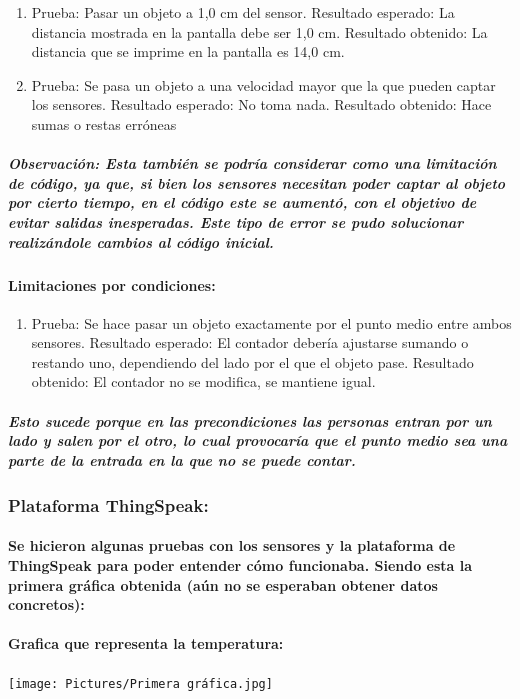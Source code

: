 \documentclass[12pt]{article} %
\newcommand{\normalsubparagraph}[1]{\subparagraph{\textnormal{#1}}}
\newcommand{\normalparagraph}[1]{\paragraph{\textnormal{#1}}}
\begin{document}
\begin{enumerate}
    \item Prueba: Pasar un objeto a 1,0 cm del sensor.  
Resultado esperado: La distancia mostrada en la pantalla debe ser 1,0 cm.
Resultado obtenido: La distancia que se imprime en la pantalla es 14,0 cm.
    \item Prueba: Se pasa un objeto a una velocidad mayor que la que pueden captar los sensores.
Resultado esperado: No toma nada.
Resultado obtenido: Hace sumas o restas erróneas
\end{enumerate}
\newpage
\subparagraph{Observación: Esta también se podría considerar como una limitación de código, ya que, si bien los sensores necesitan poder captar al objeto por cierto tiempo, en el código este se aumentó, con el objetivo de evitar salidas inesperadas. Este tipo de error se pudo solucionar realizándole cambios al código inicial.}

\normalparagraph{Limitaciones por condiciones:}
\begin{enumerate}
    \item Prueba: Se hace pasar un objeto exactamente por el punto medio entre ambos sensores.
Resultado esperado: El contador debería ajustarse sumando o restando uno, dependiendo del lado por el que el objeto pase.
Resultado obtenido: El contador no se modifica, se mantiene igual.
\end{enumerate}

\normalsubparagraph{Esto sucede porque en las precondiciones las personas entran por un lado y salen por el otro, lo cual provocaría que el punto medio sea una parte de la entrada en la que no se puede contar.}

\subsubsection{Plataforma ThingSpeak:} %
\normalparagraph{Se hicieron algunas pruebas con los sensores y la plataforma de ThingSpeak para poder entender cómo funcionaba. Siendo esta la primera gráfica obtenida (aún no se esperaban obtener datos concretos):}

\normalparagraph{Grafica que representa la temperatura:}

\begin{center}
\begin{minipage}[c]{0.65\textwidth} %
  \centering
  \texttt{[image: Pictures/Primera gráfica.jpg]}
  \label{fig:primera-grafica}
\end{minipage}
\end{center}
\end{document}
